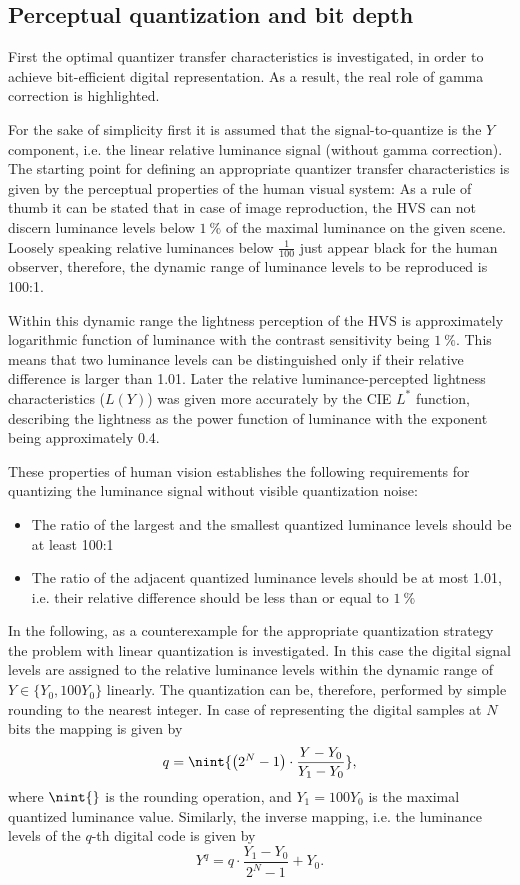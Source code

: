 \subsection{Perceptual quantization and bit depth}
First the optimal quantizer transfer characteristics is investigated, in order to achieve bit-efficient digital representation.
As a result, the real role of gamma correction is highlighted.

For the sake of simplicity first it is assumed that the signal-to-quantize is the $Y$ component, i.e. the linear relative luminance signal (without gamma correction).
The starting point for defining an appropriate quantizer transfer characteristics is given by the perceptual properties of the human visual system:
As a rule of thumb it can be stated that in case of image reproduction, the HVS can not discern luminance levels below $1~\%$ of the maximal luminance on the given scene.
Loosely speaking relative luminances below $\frac{1}{100}$ just appear black for the human observer, therefore, the dynamic range of luminance levels to be reproduced is 100:1.

Within this dynamic range the lightness perception of the HVS is approximately logarithmic function of luminance with the contrast sensitivity being $1~\%$.
This means that two luminance levels can be distinguished only if their relative difference is larger than 1.01.
Later the relative luminance-percepted lightness characteristics ($L(Y)$) was given more accurately by the CIE $L^*$ function, describing the lightness as the power function of luminance with the exponent being approximately 0.4.

These properties of human vision establishes the following requirements for quantizing the luminance signal without visible quantization noise:
\begin{itemize}
\item The ratio of the largest and the smallest quantized luminance levels should be at least 100:1
\item The ratio of the adjacent quantized luminance levels should be at most 1.01, i.e. their relative difference should be less than or equal to $1~\%$
\end{itemize}

In the following, as a counterexample for the appropriate quantization strategy the problem with linear quantization is investigated.
In this case the digital signal levels are assigned to the relative luminance levels within the dynamic range of $Y \in \lbrace Y_0, 100 Y_0 \rbrace$ linearly. 
The quantization can be, therefore, performed by simple rounding to the nearest integer.
In case of representing the digital samples at $N$ bits the mapping is given by 
\begin{equation}
q =  \nint{ \left( 2^N - 1 \right) \cdot  \frac{Y - Y_0 }{Y_1 - Y_0 } },
\end{equation}
where $\nint{}$ is the rounding operation, and $Y_1 = 100Y_0$ is the maximal quantized luminance value.
Similarly, the inverse mapping, i.e. the luminance levels of the $q$-th digital code is given by
\begin{equation}
Y^q = q \cdot \frac{Y_1 - Y_0}{2^N - 1} + Y_0.
\end{equation}

